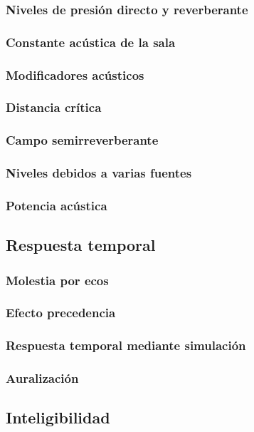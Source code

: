 \documentclass[a4paper, 8pt]{extarticle}
\begin{document}
\begin{multicols}{3}
  \subsubsection{Niveles de presión directo y reverberante}
  \subsubsection{Constante acústica de la sala}
  \subsubsection{Modificadores acústicos}
  \subsubsection{Distancia crítica}
  \subsubsection{Campo semirreverberante}
  \subsubsection{Niveles debidos a varias fuentes}
  \subsubsection{Potencia acústica}

  \subsection{Respuesta temporal}
  \subsubsection{Molestia por ecos}
  \subsubsection{Efecto precedencia}
  \subsubsection{Respuesta temporal mediante simulación}
  \subsubsection{Auralización}

  \subsection{Inteligibilidad}

\end{multicols}
\end{document}
